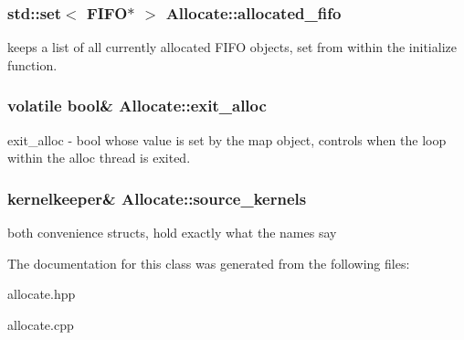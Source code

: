 \subsubsection[{allocated\+\_\+fifo}]{\setlength{\rightskip}{0pt plus 5cm}std\+::set$<$ F\+I\+F\+O$\ast$ $>$ Allocate\+::allocated\+\_\+fifo\hspace{0.3cm}{\ttfamily [protected]}}\label{class_allocate_a037410210c0d10578f87de1ec68f47ba}
keeps a list of all currently allocated F\+I\+F\+O objects, set from within the initialize function. \hypertarget{class_allocate_a4d10076b88ab1297c89b8a05e117b510}{}
\subsubsection[{exit\+\_\+alloc}]{\setlength{\rightskip}{0pt plus 5cm}volatile bool\& Allocate\+::exit\+\_\+alloc\hspace{0.3cm}{\ttfamily [protected]}}\label{class_allocate_a4d10076b88ab1297c89b8a05e117b510}
exit\+\_\+alloc -\/ bool whose value is set by the map object, controls when the loop within the alloc thread is exited. \hypertarget{class_allocate_a93e612d7ea7eb686fc88b5dee7a1407b}{}
\subsubsection[{source\+\_\+kernels}]{\setlength{\rightskip}{0pt plus 5cm}kernelkeeper\& Allocate\+::source\+\_\+kernels\hspace{0.3cm}{\ttfamily [protected]}}\label{class_allocate_a93e612d7ea7eb686fc88b5dee7a1407b}
both convenience structs, hold exactly what the names say 

The documentation for this class was generated from the following files\+:\begin{DoxyCompactItemize}
\item 
allocate.\+hpp\item 
allocate.\+cpp\end{DoxyCompactItemize}
